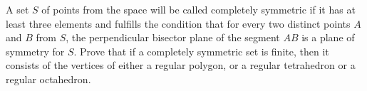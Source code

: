 A set $S$ of points from the space will be called
completely symmetric if it has at least three elements
and fulfills the condition that for every two distinct points
$A$ and $B$ from $S$,
the perpendicular bisector plane of the segment $AB$
is a plane of symmetry for $S$.
Prove that if a completely symmetric set is finite,
then it consists of the vertices of either a regular polygon,
or a regular tetrahedron or a regular octahedron.